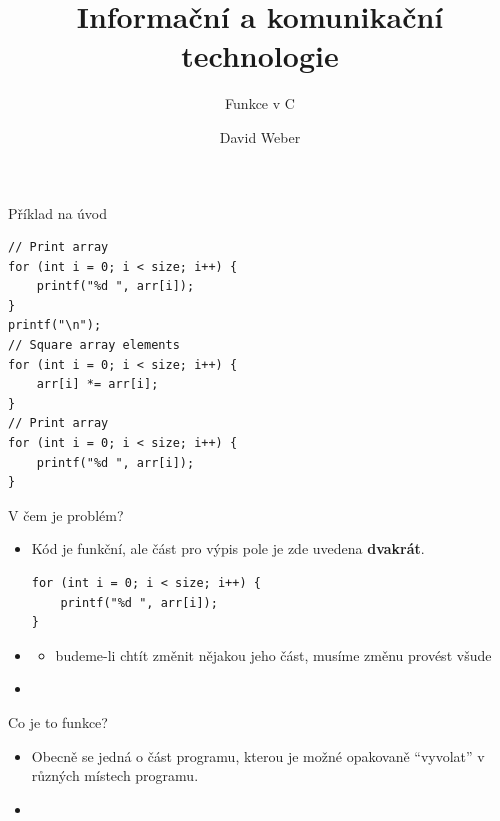 \documentclass[14pt,aspectratio=169]{beamer}
\title{Informační a komunikační technologie}
\subtitle{Funkce v C}
\author{David Weber}
\begin{document}

    \begin{frame}
        \titlepage
    \end{frame}

    \begin{frame}[t,fragile]{Příklad na úvod}
        \begin{lstlisting}
// Print array
for (int i = 0; i < size; i++) {
    printf("%d ", arr[i]);
}
printf("\n");
// Square array elements
for (int i = 0; i < size; i++) {
    arr[i] *= arr[i];
}
// Print array
for (int i = 0; i < size; i++) {
    printf("%d ", arr[i]);
}
        \end{lstlisting}
    \end{frame}

    \begin{frame}[t,fragile]{V čem je problém?}
        \begin{itemize}
            \item Kód je funkční, ale část pro výpis pole je zde uvedena \textbf{dvakrát}.
            \begin{lstlisting}
for (int i = 0; i < size; i++) {
    printf("%d ", arr[i]);
}
            \end{lstlisting}
            \item {} \xmark
            \begin{itemize}
                \item budeme-li chtít změnit nějakou jeho část, musíme změnu provést všude
            \end{itemize}
            \item {} \cmark
        \end{itemize}
    \end{frame}

    \begin{frame}[t]{Co je to funkce?}
        \begin{itemize}
            \item Obecně se jedná o část programu, kterou je možné opakovaně ``vyvolat'' v různých místech programu.
            \item 
        \end{itemize}
    \end{frame}
\end{document}
